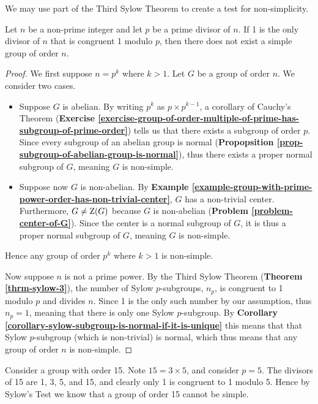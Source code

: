 We may use part of the Third Sylow Theorem to create a test for non-simplicity.
\begin{theorem}
    Let $n$ be a non-prime integer and let $p$ be a prime divisor of $n$. If 1 is the only divisor of $n$ that is congruent 1 modulo $p$, then there does not exist a simple group of order $n$.
\end{theorem}
\begin{proof}
    We first suppose $n = p^k$ where $k > 1$. Let $G$ be a group of order $n$. We consider two cases.
    \begin{itemize}
        \item Suppose $G$ is abelian. By writing $p^k$ as $p \times p^{k-1}$, a corollary of Cauchy's Theorem (\textbf{Exercise \ref{exercise-group-of-order-multiple-of-prime-has-subgroup-of-prime-order}}) tells us that there exists a subgroup of order $p$. Since every subgroup of an abelian group is normal (\textbf{Propopsition \ref{prop-subgroup-of-abelian-group-is-normal}}), thus there exists a proper normal subgroup of $G$, meaning $G$ is non-simple.
        \item Suppose now $G$ is non-abelian. By \textbf{Example \ref{example-group-with-prime-power-order-has-non-trivial-center}}, $G$ has a non-trivial center. Furthermore, $G \neq \mathrm{Z}(G)$ because $G$ is non-abelian (\textbf{Problem \ref{problem-center-of-G}}). Since the center is a normal subgroup of $G$, it is thus a proper normal subgroup of $G$, meaning $G$ is non-simple.
    \end{itemize}
    Hence any group of order $p^k$ where $k > 1$ is non-simple.

    Now suppose $n$ is not a prime power. By the Third Sylow Theorem (\textbf{Theorem \ref{thrm-sylow-3}}), the number of Sylow $p$-subgroups, $n_p$, is congruent to 1 modulo $p$ and divides $n$. Since 1 is the only such number by our assumption, thus $n_p = 1$, meaning that there is only one Sylow $p$-subgroup. By \textbf{Corollary \ref{corollary-sylow-subgroup-is-normal-if-it-is-unique}} this means that that Sylow $p$-subgroup (which is non-trivial) is normal, which thus means that any group of order $n$ is non-simple.
\end{proof}
\begin{example}
    Consider a group with order 15. Note $15 = 3 \times 5$, and consider $p = 5$. The divisors of 15 are 1, 3, 5, and 15, and clearly only 1 is congruent to 1 modulo 5. Hence by Sylow's Test we know that a group of order 15 cannot be simple.
\end{example}

